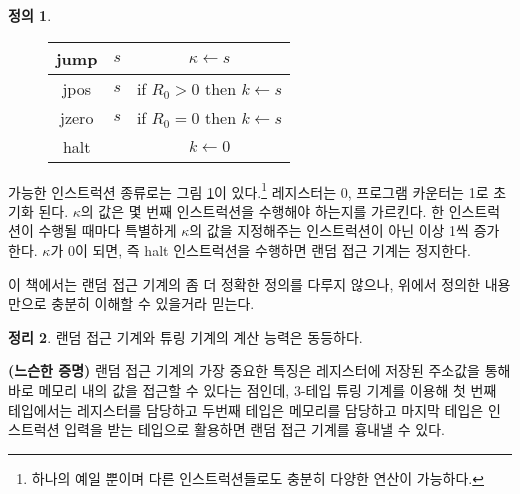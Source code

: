\documentclass[b5paper, 11pt]{book}
\theoremstyle{definition}
\newtheorem{defn}{정의}[chapter]
\newtheorem{thm}[defn]{정리}
\newenvironment{pf*}{\pushQED{\qed}\pf}
{\popQED\endpf}
\begin{document}
\begin{defn}
\begin{figure}[!ht]
\begin{tabular}{ ccc }
            \hline 
            jump & $s$ & $\kappa \gets s$ \\ 
            \hline 
            jpos & $s$ & if $R_0 > 0$ then $k \gets s$ \\ 
            \hline 
            jzero & $s$ & if $R_0 = 0$ then $k \gets s$ \\ 
            \hline 
            halt & & $k \gets 0$
        \end{tabular}
        \caption{}
        \label{iiiii}
    \end{figure}
    가능한 인스트럭션 종류로는 그림 \ref{iiiii}이 있다.\footnote{하나의 예일 뿐이며 다른 인스트럭션들로도 충분히 다양한 연산이 가능하다.} 레지스터는 0, 프로그램 카운터는 1로 초기화 된다. $\kappa$의 값은 몇 번째 인스트럭션을 수행해야 하는지를 가르킨다. 한 인스트럭션이 수행될 때마다 특별하게 $\kappa$의 값을 지정해주는 인스트럭션이 아닌 이상 1씩 증가한다. $\kappa$가 0이 되면, 즉 halt 인스트럭션을 수행하면 랜덤 접근 기계는 정지한다.
\end{defn}
이 책에서는 랜덤 접근 기계의 좀 더 정확한 정의를 다루지 않으나, 위에서 정의한 내용만으로  충분히 이해할 수 있을거라 믿는다. 
\begin{thm}
    랜덤 접근 기계와 튜링 기계의 계산 능력은 동등하다.
\end{thm}
\begin{pf*}
    \textbf{(느슨한 증명)} 랜덤 접근 기계의 가장 중요한 특징은 레지스터에 저장된 주소값을 통해 바로 메모리 내의 값을 접근할 수 있다는 점인데, $3$-테입 튜링 기계를 이용해 첫 번째 테입에서는 레지스터를 담당하고 두번째 테입은 메모리를 담당하고 마지막 테입은 인스트럭션 입력을 받는 테입으로 활용하면 랜덤 접근 기계를 흉내낼 수 있다.
\end{pf*}
\end{document}
